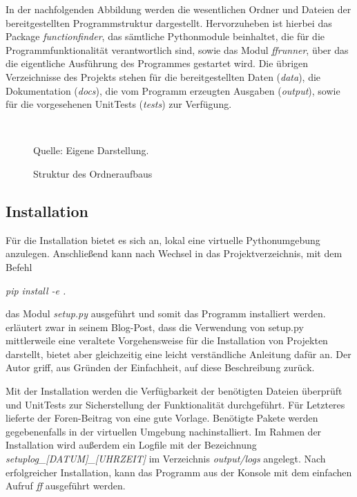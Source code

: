 In der nachfolgenden Abbildung werden die wesentlichen Ordner und Dateien der bereitgestellten Programmstruktur dargestellt. Hervorzuheben ist hierbei das Package \emph{functionfinder}, das sämtliche Pythonmodule beinhaltet, die für die Programmfunktionalität verantwortlich sind, sowie das Modul \emph{ffrunner}, über das die eigentliche Ausführung des Programmes gestartet wird.
Die übrigen Verzeichnisse des Projekts stehen für die bereitgestellten Daten (\emph{data}), die Dokumentation (\emph{docs}), die vom Programm erzeugten Ausgaben (\emph{output}), sowie für die vorgesehenen UnitTests (\emph{tests}) zur Verfügung.


\begin{figure}[h]
\caption{Struktur des Ordneraufbaus}
\begin{tabular}{c}  %

\end{tabular}\\
\centering
Quelle: Eigene Darstellung.
\label{fig:structure}
\end{figure}

\subsection{Installation}
\label{sec:installation}

Für die Installation bietet es sich an, lokal eine virtuelle Pythonumgebung anzulegen. Anschließend kann nach Wechsel in das Projektverzeichnis, mit dem Befehl
\begin{center}\emph{pip install -e .}\end{center}
das Modul \emph{setup.py} ausgeführt und somit das Programm installiert werden. \cite{geer_practical_2019} erläutert zwar in seinem Blog-Post, dass die Verwendung von setup.py mittlerweile eine veraltete Vorgehensweise für die Installation von Projekten darstellt, bietet aber gleichzeitig eine leicht verständliche Anleitung dafür an. Der Autor griff, aus Gründen der Einfachheit, auf diese Beschreibung zurück.  

Mit der Installation werden die Verfügbarkeit der benötigten Dateien überprüft und UnitTests zur Sicherstellung der Funktionalität durchgeführt. Für Letzteres lieferte der Foren-Beitrag von \cite{jesuisme_answer_2021} eine gute Vorlage. Benötigte Pakete werden gegebenenfalls in der virtuellen Umgebung nachinstalliert. Im Rahmen der Installation wird außerdem ein Logfile mit der Bezeichnung \emph{setuplog\_[DATUM]\_[UHRZEIT]} im Verzeichnis \emph{output/logs} angelegt. Nach erfolgreicher Installation, kann das Programm aus der Konsole mit dem einfachen Aufruf \emph{\glqq ff\grqq} ausgeführt werden.


